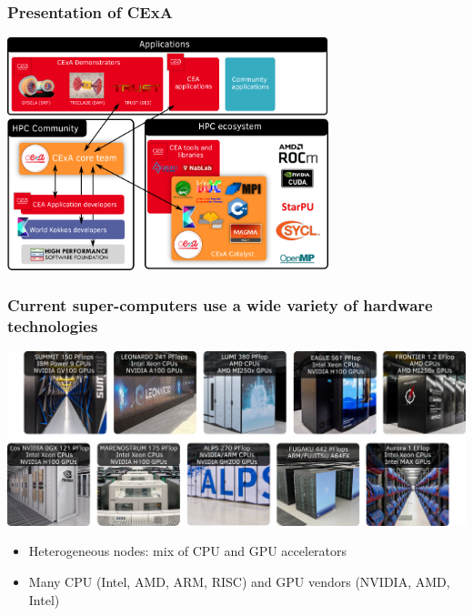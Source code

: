 \documentclass[aspectratio=169]{beamer}
\begin{document}
\begin{frame}
\frametitle{Presentation of CExA}

\begin{center}
    \includegraphics[width=0.7\textwidth]{../../images/cexa.png}
\end{center}

\end{frame}


\begin{frame}
\frametitle{Current super-computers use a wide variety of hardware technologies}

\begin{center}
    \includegraphics[width=1\textwidth]{../../images/top10_super_computers.png}
\end{center}


\begin{itemize}
\item Heterogeneous nodes: mix of CPU and GPU accelerators
\item Many CPU (Intel, AMD, ARM, RISC) and GPU vendors (NVIDIA, AMD, Intel)
\end{itemize}

\end{frame}

\end{document}
